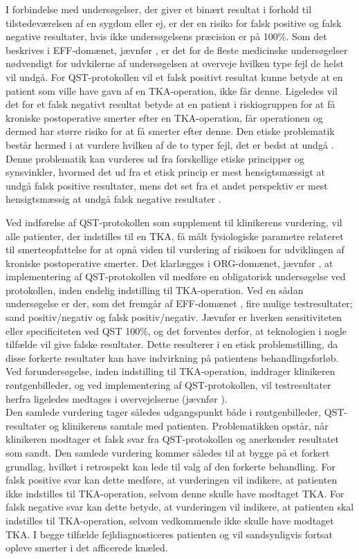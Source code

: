 I forbindelse med undersøgelser, der giver et binært resultat i forhold til tilstedeværelsen af en sygdom eller ej, er der en risiko for falsk positive og falsk negative resultater, hvis ikke undersøgelsens præcision er på 100\%. Som det beskrives i EFF-domænet, jævnfør , er det for de fleste medicinske undersøgelser nødvendigt for udvkilerne af undersøgelsen at overveje hvilken type fejl de helst vil undgå. For QST-protokollen vil et falsk positivt resultat kunne betyde at en patient som ville have gavn af en TKA-operation, ikke får denne. Ligeledes vil det for et falsk negativt resultat betyde at en patient i riskiogruppen for at få kroniske postoperative smerter efter en TKA-operation, får operationen og dermed har større risiko for at få smerter efter denne. Den etiske problematik består hermed i at vurdere hvilken af de to typer fejl, det er bedst at undgå \citep{Kraemer2011}. \\
Denne problematik kan vurderes ud fra forskellige etiske principper og synsvinkler, hvormed det ud fra et etisk princip er mest hensigtsmæssigt at undgå falsk positive resultater, mens det set fra et andet perspektiv er mest hensigtsmæssig at undgå falsk negative resultater \citep{Kraemer2011}.      

Ved indførelse af QST-protokollen som supplement til klinikerens vurdering, vil alle patienter, der indstilles til en TKA, få målt fysiologiske parametre relateret til smerteopfattelse for at opnå viden til vurdering af risikoen for udviklingen af kroniske postoperative smerter. 
Det klarlægges i ORG-domænet, jævnfør , at implementering af QST-protokollen vil medføre en obligatorisk undersøgelse ved protokollen, inden endelig indstilling til TKA-operation. Ved en sådan undersøgelse er der, som det fremgår af EFF-domænet , fire mulige testresultater; sand positiv/negativ og falsk positiv/negativ. Jævnfør  er hverken sensitiviteten eller specificiteten ved QST 100\%,  og det forventes derfor, at teknologien i nogle tilfælde vil give falske resultater. Dette resulterer i en etisk problemstilling, da disse forkerte resultater kan have indvirkning på patientens behandlingsforløb. 
Ved forundersøgelse, inden indstilling til TKA-operation, inddrager klinikeren røntgenbilleder, og ved implementering af QST-protokollen, vil testresultater herfra ligeledes medtages i overvejelserne (jævnfør ). \\
Den samlede vurdering tager således udgangspunkt både i røntgenbilleder, QST-resultater og klinikerens samtale med patienten. Problematikken opstår, når klinikeren modtager et falsk svar fra QST-protokollen og anerkender resultatet som sandt. Den samlede vurdering kommer således til at bygge på et forkert grundlag, hvilket i retrospekt kan lede til valg af den forkerte behandling. 
For falsk positive svar kan dette medføre, at vurderingen vil indikere, at patienten ikke indstilles til TKA-operation, selvom denne skulle have modtaget TKA.
For falsk negative svar kan dette betyde, at vurderingen vil indikere, at patienten skal indstilles til TKA-operation, selvom vedkommende ikke skulle have modtaget TKA.
I begge tilfælde fejldiagnosticeres patienten og vil sandsynligvis fortsat opleve smerter i det afficerede knæled.

